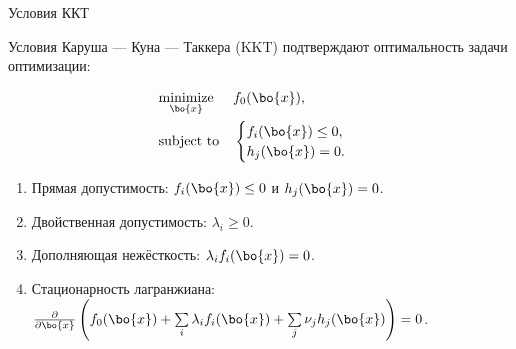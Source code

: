 \documentclass{beamer}
\begin{document}
\begin{frame}{Условия ККТ}
	\begin{flushleft}
		
		Условия Каруша — Куна — Таккера (KKT) подтверждают оптимальность задачи оптимизации:
		
		\begin{equation}
			\begin{aligned}
				& \underset{\bo{x}}{\text{minimize}}
				& & f_0(\bo{x}), \\
				& \text{subject to}
				& & \begin{cases}
					f_i(\bo{x}) \leq 0, \\
					h_j(\bo{x}) = 0.
				\end{cases}
			\end{aligned}
		\end{equation}
		
		\begin{enumerate}
			\item Прямая допустимость: $f_i(\bo{x}) \leq 0$ и $h_j(\bo{x}) = 0$.
			
			\item Двойственная допустимость: $\lambda_i \geq 0$.
			
			\item Дополняющая нежёсткость: $\lambda_i f_i(\bo{x}) = 0$.
			
			\item Стационарность лагранжиана: $\frac{\partial}{\partial \bo{x}} 
			\left ( f_0(\bo{x}) + 
			\sum\limits_i \lambda_i f_i(\bo{x}) +
			\sum\limits_j \nu_j h_j(\bo{x}) \right ) = 0$.
		\end{enumerate}
		
	\end{flushleft}
\end{frame}
\end{document}
